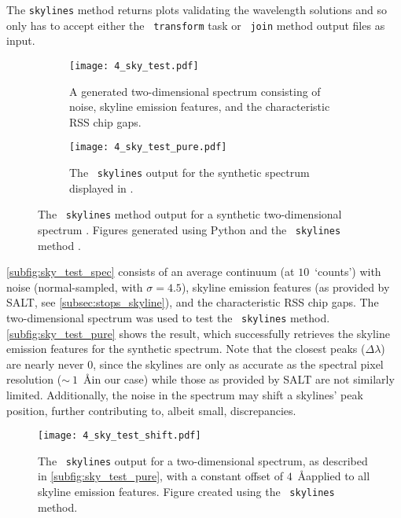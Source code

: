 The \texttt{skylines} method returns plots validating the wavelength solutions and so only has to accept either the \iraf\ \texttt{transform} task or \stops\ \texttt{join} method output files as input.

\begin{figure}[t]
    \centering
    \begin{subfigure}[b]{1.0 \textwidth}
        \centering
        \texttt{[image: 4\_sky\_test.pdf]}
        \caption{A generated two-dimensional spectrum consisting of noise, skyline emission features, and the characteristic \gls{RSS} chip gaps.}
        \label{subfig:sky_test_spec}
    \end{subfigure}
    \hfill
    \begin{subfigure}[b]{1.0 \textwidth}
        \centering
        \texttt{[image: 4\_sky\_test\_pure.pdf]}
        \caption{The \stops\ \texttt{skylines} output for the synthetic spectrum displayed in .}
        \label{subfig:sky_test_pure}
    \end{subfigure}
    \caption{The \stops\ \texttt{skylines} method output  for a synthetic two-dimensional spectrum . Figures generated using Python  and the \stops\ \texttt{skylines} method .}
    \label{fig:sky_test}
\end{figure}

\autoref{subfig:sky_test_spec} consists of an average continuum (at $10$~`counts') with noise (normal-sampled, with $\sigma = 4.5$), skyline emission features (as provided by \gls{SALT}, see \autoref{subsec:stops_skyline}), and the characteristic \gls{RSS} chip gaps.
The two-dimensional spectrum was used to test the \stops\ \texttt{skylines} method.
\autoref{subfig:sky_test_pure} shows the result, which successfully retrieves the skyline emission features for the synthetic spectrum.
Note that the closest peaks ($\Delta \lambda$) are nearly never $0$, since the skylines are only as accurate as the spectral pixel resolution ($\sim~1$~\AA in our case) while those as provided by \gls{SALT} are not similarly limited.
Additionally, the noise in the spectrum may shift a skylines' peak position, further contributing to, albeit small, discrepancies.

\begin{figure}[t]
    \centering
    \texttt{[image: 4\_sky\_test\_shift.pdf]}
    \caption{The \stops\ \texttt{skylines} output for a two-dimensional spectrum, as described in \autoref{subfig:sky_test_pure}, with a constant offset of $4$~\AA applied to all skyline emission features. Figure created using the \stops\ \texttt{skylines} method.}
    \label{fig:sky_test_shift}
\end{figure}

